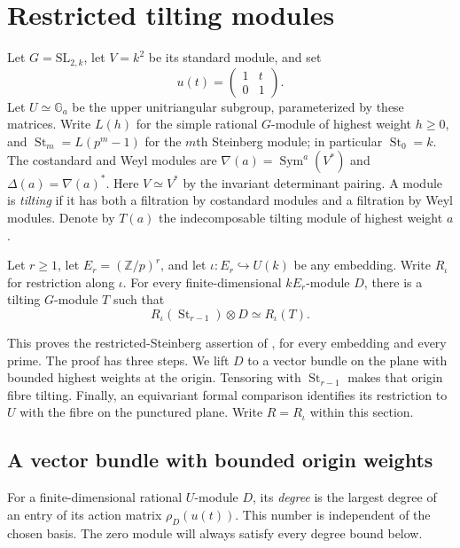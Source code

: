 \section{Restricted tilting modules}
\label{sec:restricted}

Let $G=\mathrm{SL}_{2,k}$, let $V=k^2$ be its standard module, and set
\[
 u(t)=\begin{pmatrix}1&t\\0&1\end{pmatrix}.
\]
Let $U\simeq\mathbb G_a$ be the upper unitriangular subgroup,
parameterized by these matrices. Write $L(h)$ for the simple rational $G$-module of highest weight
$h\geq0$, and $\operatorname{St}_m=L(p^m-1)$ for the $m$th Steinberg
module; in particular $\operatorname{St}_0=k$.
The costandard and Weyl modules are
$\nabla(a)=\operatorname{Sym}^a(V^*)$ and $\Delta(a)=\nabla(a)^*$.
Here $V\simeq V^*$ by the invariant determinant pairing.
A module is \emph{tilting} if it has both a filtration by costandard
modules and a filtration by Weyl modules. Denote by $T(a)$ the
indecomposable tilting module of highest weight $a$.

\begin{theorem}\label{thm:restricted-tilting}
Let $r\geq1$, let $E_r=(\mathbb Z/p)^r$, and let
$\iota:E_r\hookrightarrow U(k)$ be any embedding. Write $R_\iota$
for restriction along $\iota$. For every finite-dimensional
$kE_r$-module $D$, there is a tilting $G$-module $T$ such that
\[
 R_\iota(\operatorname{St}_{r-1})\otimes D\simeq R_\iota(T).
\]
\end{theorem}

This proves the restricted-Steinberg assertion of
\cite[Conjecture~1]{CoulembierFlakeSteinberg}, for every embedding and
every prime. The proof has three steps. We lift $D$ to a vector bundle
on the plane with bounded highest weights at the origin. Tensoring
with $\operatorname{St}_{r-1}$ makes that origin fibre tilting. Finally,
an equivariant formal comparison identifies its restriction to $U$
with the fibre on the punctured plane. Write $R=R_\iota$ within this section.

\subsection{A vector bundle with bounded origin weights}
\label{subsec:geometric-lift}

For a finite-dimensional rational $U$-module $D$, its \emph{degree}
is the largest degree of an entry of its action matrix $\rho_D(u(t))$.
This number is independent of the chosen basis. The zero module will
always satisfy every degree bound below.

